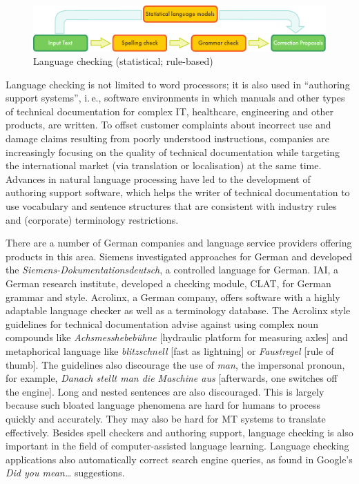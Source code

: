 \documentclass[]{../../metanetpaper}
\begin{document}
\begin{multicols}{2}
\begin{figure}[htb]
  \center
  \includegraphics[width=\textwidth]{../_media/english/language_checking}
  \caption{Language checking (statistical; rule-based)}
  \label{fig:langcheckingaarch_en}
\end{figure}

Language checking is not limited to word processors; it is also used in “authoring support systems”, i.\,e., software environments in which manuals and other types of technical documentation for complex IT, healthcare, engineering and other products, are written. To offset customer complaints about incorrect use and damage claims resulting from poorly understood instructions, companies are increasingly focusing on the quality of technical documentation while targeting the international market (via translation or localisation) at the same time. Advances in natural language processing have led to the development of authoring support software, which helps the writer of technical documentation to use vocabulary and sentence structures that are consistent with industry rules and (corporate) terminology restrictions.


There are a number of German companies and language service providers offering products in this area. Siemens investigated approaches for German and developed the \textit{Siemens-Dokumentationsdeutsch}, a controlled language for German. IAI, a German research institute, developed a checking module, CLAT, for German grammar and style. Acrolinx, a German company, offers software with a highly adaptable language checker as well as a terminology database. The Acrolinx style guidelines for technical documentation advise against using complex noun compounds like \textit{Achsmesshebebühne} {[}hydraulic platform for measuring axles{]} and metaphorical language like \textit{blitzschnell} {[}fast as lightning{]} or \textit{Faustregel} {[}rule of thumb{]}. The guidelines also discourage the use of \textit{man}, the impersonal pronoun, for example, \textit{Danach stellt man die Maschine aus} {[}afterwards, one switches off the engine{]}. Long and nested sentences are also discouraged. This is largely because such bloated language phenomena are hard for humans to process quickly and accurately. They may also be hard for MT systems to translate effectively.
Besides spell checkers and authoring support, language checking is also important in the field of computer-assisted language learning. Language checking applications also automatically correct search engine queries, as found in Google's \textit{Did you mean…} suggestions.


\end{multicols}
\end{document}

